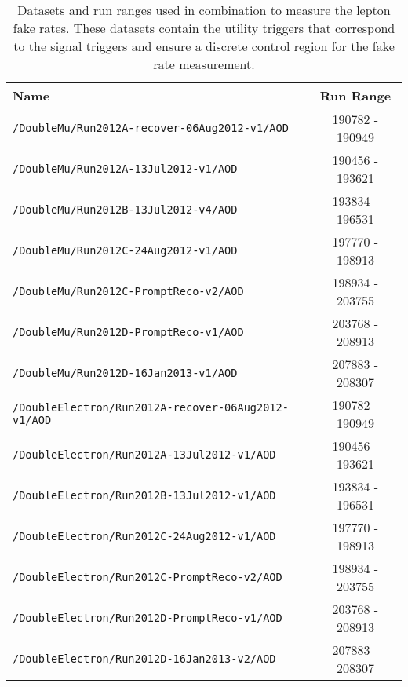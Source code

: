 \begin{table}[hbt]
\caption{\label{tab:FRDsets}Datasets and run ranges used in combination to measure the lepton fake rates. These datasets contain the utility triggers that correspond to the signal triggers and ensure a discrete control region for the fake rate measurement.}
\begin{center}
\begin{tabular}{lc}\hline\hline
Name		& Run Range \\ \hline
\verb=/DoubleMu/Run2012A-recover-06Aug2012-v1/AOD=                 &   190782 - 190949\\ 
\verb=/DoubleMu/Run2012A-13Jul2012-v1/AOD=                                  &  190456 - 193621                     \\ 
\verb=/DoubleMu/Run2012B-13Jul2012-v4/AOD=                                  &  193834 - 196531                     \\ 
\verb=/DoubleMu/Run2012C-24Aug2012-v1/AOD=                                &  197770 - 198913 \\  
\verb=/DoubleMu/Run2012C-PromptReco-v2/AOD=                               &  198934 - 203755                     \\ 
\verb=/DoubleMu/Run2012D-PromptReco-v1/AOD=                               &  203768 - 208913  \\
\verb=/DoubleMu/Run2012D-16Jan2013-v1/AOD=                                 &  207883 - 208307  \\

\verb=/DoubleElectron/Run2012A-recover-06Aug2012-v1/AOD=         &   190782 - 190949                    \\ 
\verb=/DoubleElectron/Run2012A-13Jul2012-v1/AOD=                         & 190456 - 193621                      \\ 
\verb=/DoubleElectron/Run2012B-13Jul2012-v1/AOD=                         &  193834 - 196531 \\ 
\verb=/DoubleElectron/Run2012C-24Aug2012-v1/AOD=                       &   197770 - 198913                    \\ 
\verb=/DoubleElectron/Run2012C-PromptReco-v2/AOD=                     &    198934 - 203755                  \\ 
\verb=/DoubleElectron/Run2012D-PromptReco-v1/AOD=                      &  203768 - 208913  \\
\verb=/DoubleElectron/Run2012D-16Jan2013-v2/AOD=                        &   207883 - 208307 \\


\end{tabular}
\end{center}
\end{table}
